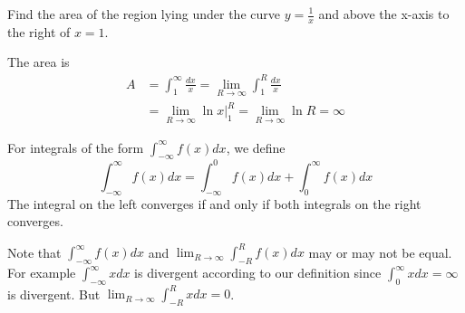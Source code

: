 \documentclass[calc1-main.tex]{subfiles}
\begin{document}
\begin{example}
	Find the area of the region lying under the curve $y=\frac{1}{x}$ and above the x-axis to the right of $x=1$.
\end{example}
\begin{minipage}{0.5\textwidth}
  \begin{solution}
  	The area is
  	\[
  	\begin{split}
  		A & = \int_1^{\infty} \frac{dx}{x} =
  		\lim_{R \to \infty} \int_1^R \frac{dx}{x} \\
  		& = \lim_{R \to \infty} \left. \ln x \right \vert_1^R=
  		\lim_{R \to \infty} \ln R =
  		\infty
  	\end{split}
  	\]
  \end{solution}
\end{minipage}%
\begin{minipage}{0.5\textwidth}
\begin{figure}[H]
  	\centering
\end{figure}
\end{minipage}

\begin{definition}
  For integrals of the form $\displaystyle \int_{-\infty}^{\infty} f(x) dx$, we define
  \[
    \int_{-\infty}^{\infty} f(x) dx = \int_{-\infty}^0 f(x) dx + \int_0^{\infty} f(x) dx
  \]
  The integral on the left converges if and only if both integrals on the right converges.
\end{definition}

Note that $\int_{-\infty}^{\infty} f(x) dx$ and $\lim_{R \to \infty} \int_{-R}^{R} f(x) dx$ may or may not be equal. For example $\int_{-\infty}^{\infty} x dx$ is divergent according to our definition since $\int_{0}^{\infty} x dx = \infty$ is divergent. But $\lim_{R \to \infty} \int_{-R}^{R} x dx = 0$.
\end{document}
